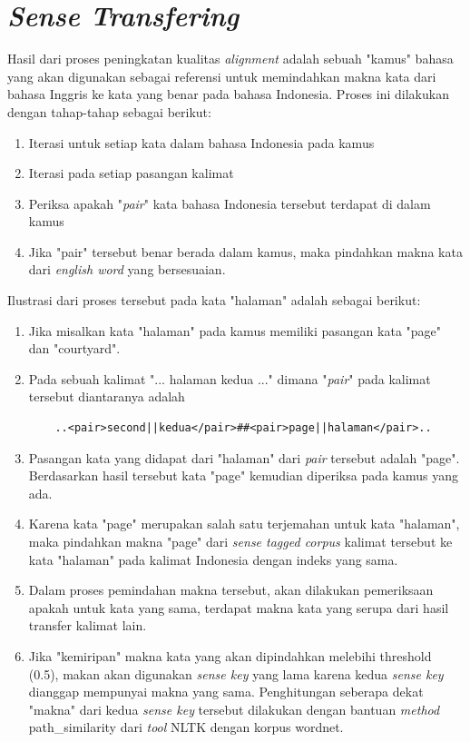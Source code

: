 \section{\textit{Sense Transfering}}
Hasil dari proses peningkatan kualitas \textit{alignment} adalah sebuah "kamus" bahasa yang akan digunakan sebagai referensi untuk memindahkan makna kata dari bahasa Inggris ke kata yang benar pada bahasa Indonesia. Proses ini dilakukan dengan tahap-tahap sebagai berikut:

\begin{enumerate}
	\item Iterasi untuk setiap kata dalam bahasa Indonesia pada kamus
	\item Iterasi pada setiap pasangan kalimat
	\item Periksa apakah "\textit{pair}" kata bahasa Indonesia tersebut terdapat di dalam kamus
	\item Jika "pair" tersebut benar berada dalam kamus, maka pindahkan makna kata dari \textit{english word} yang bersesuaian.
\end{enumerate}

Ilustrasi dari proses tersebut pada kata "halaman" adalah sebagai berikut:

\begin{enumerate}
	\item Jika misalkan kata "halaman" pada kamus memiliki pasangan kata "page" dan "courtyard".
	\item Pada sebuah kalimat "... halaman kedua ..." dimana "\textit{pair}" pada kalimat tersebut diantaranya adalah
	\begin{lstlisting}
	..<pair>second||kedua</pair>##<pair>page||halaman</pair>..
	\end{lstlisting}
	\item Pasangan kata yang didapat dari "halaman" dari \textit{pair} tersebut adalah "page". Berdasarkan hasil tersebut kata "page" kemudian diperiksa pada kamus yang ada.
	\item Karena kata "page" merupakan salah satu terjemahan untuk kata "halaman", maka pindahkan makna "page" dari \textit{sense tagged corpus} kalimat tersebut ke kata "halaman" pada kalimat Indonesia dengan indeks yang sama.
	\item Dalam proses pemindahan makna tersebut, akan dilakukan pemeriksaan apakah untuk kata yang sama, terdapat makna kata yang serupa dari hasil transfer kalimat lain.
	\item Jika "kemiripan" makna kata yang akan dipindahkan melebihi threshold (0.5), makan akan digunakan \textit{sense key} yang lama karena kedua \textit{sense key} dianggap mempunyai makna yang sama. Penghitungan seberapa dekat "makna" dari kedua \textit{sense key} tersebut dilakukan dengan bantuan \textit{method} path\_similarity dari \textit{tool} NLTK dengan korpus wordnet.
\end{enumerate}

